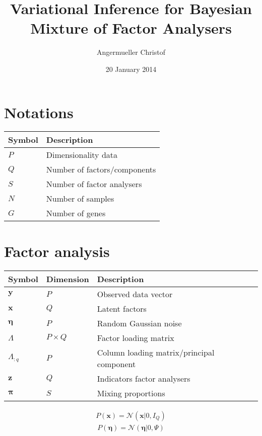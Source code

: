 \documentclass[a4paper]{article}
\author{Angermueller Christof}
\date{20 January 2014}
\title{Variational Inference for Bayesian Mixture of Factor Analysers}
\begin{document}
\maketitle

\newcommand{\bs}{\boldsymbol}
\newcommand{\Xy}{\bs{y}^{n,g}}
\newcommand{\Xx}{\bs{x}^{n,g}}
\newcommand{\Xz}{\bs{z}^{n,g}}
\newcommand{\Xp}{\bs{\pi}}
\newcommand{\Xl}{\Lambda^s}
\newcommand{\Xn}{\bs{\nu}^s}
\newcommand{\Xe}{\Psi}
\newcommand{\Xa}{\alpha}
\newcommand{\Xc}{\Xl{\Xl}^T}

\section{Notations}
\begin{table}[h]
  \begin{center}
  \begin{tabular}{ll}
    \toprule
    Symbol & Description \\ \hline
    $P$ & Dimensionality data \\
    $Q$ & Number of factors/components \\
    $S$ & Number of factor analysers \\
    $N$ & Number of samples \\
    $G$ & Number of genes \\
    \bottomrule
  \end{tabular}
  \end{center}
\end{table}

\section{Factor analysis}
\begin{table}[h]
  \begin{center}
  \begin{tabular}{lll}
    \toprule
    Symbol & Dimension & Description \\ \hline
    $\bs{y}$ & $P$ & Observed data vector \\
    $\bs{x}$ & $Q$ & Latent factors \\
    $\bs{\eta}$ & $P$ & Random Gaussian noise \\
    $\Lambda$ & $P \times Q$ & Factor loading matrix \\
    $\Lambda_{:q}$ & $P$ & Column loading matrix/principal component \\
    $\bs{z}$ & $Q$ & Indicators factor analysers \\
    $\Xp$ & $S$ & Mixing proportions \\
    \bottomrule
  \end{tabular}
\end{center}
\end{table}
\begin{align}
  P(\bs{x})=\mathcal{N}(\bs{x}|0,I_Q)
\end{align}
\begin{align}
  P(\bs{\eta})=\mathcal{N}(\bs{\eta}|0,\Psi)
\end{align}
\end{document}
